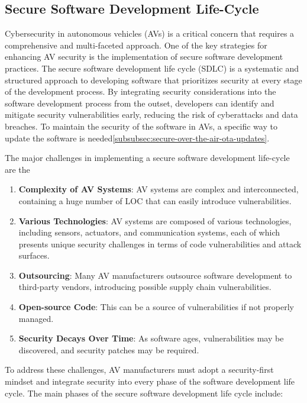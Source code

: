 \subsection{Secure Software Development Life-Cycle}\label{subsec:secure-software-development-life-cycle}

Cybersecurity in autonomous vehicles (AVs) is a critical concern that requires a comprehensive and multi-faceted approach.
One of the key strategies for enhancing AV security is the implementation of secure software development practices.
The secure software development life cycle (SDLC) is a systematic and structured approach to developing software that prioritizes security at every stage of the development process.
By integrating security considerations into the software development process from the outset, developers can identify and mitigate security vulnerabilities early, reducing the risk of cyberattacks and data breaches.
To maintain the security of the software in AVs, a specific way to update the software is needed\ref{subsubsec:secure-over-the-air-ota-updates}.

The major challenges in implementing a secure software development life-cycle are the
\begin{enumerate}
    \item \textbf{Complexity of AV Systems}: AV systems are complex and interconnected, containing a huge number of LOC that can easily introduce vulnerabilities.
    \item \textbf{Various Technologies}: AV systems are composed of various technologies, including sensors, actuators, and communication systems, each of which presents unique security challenges in terms of code vulnerabilities and attack surfaces.
    \item \textbf{Outsourcing}: Many AV manufacturers outsource software development to third-party vendors, introducing possible supply chain vulnerabilities.
    \item \textbf{Open-source Code}: This can be a source of vulnerabilities if not properly managed.
    \item \textbf{Security Decays Over Time}: As software ages, vulnerabilities may be discovered, and security patches may be required.
\end{enumerate}

To address these challenges, AV manufacturers must adopt a security-first mindset and integrate security into every phase of the software development life cycle\cite{moukahal2021towards}.
The main phases of the secure software development life cycle include:


